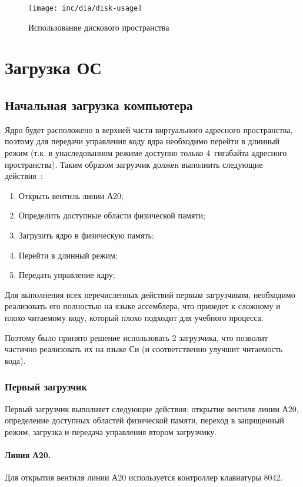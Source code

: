 \begin{figure}[ht!]
  \centering
  \texttt{[image: inc/dia/disk-usage]}
  \caption{Использование дискового пространства}
  \label{fig:disk-usage}
\end{figure}


\section{Загрузка ОС}

\subsection{Начальная загрузка компьютера}
Ядро будет расположено в верхней части
виртуального адресного пространства, поэтому для передачи управления коду
ядра необходимо перейти в длинный режим (т.к. в унаследованном режиме доступно
только 4~гигабайта адресного пространства). Таким образом загрузчик должен
выполнить следующие действия~\cite{mstu_os_dev_method}:
\begin{enumerate}[1.]
\item Открыть вентиль линии А20;
\item Определить доступные области физической памяти;
\item Загрузить ядро в физическую память;
\item Перейти в длинный режим;
\item Передать управление ядру;
\end{enumerate}

Для выполнения всех перечисленных действий первым загрузчиком, необходимо реализовать
его полностью на языке ассемблера, что приведет к сложному и плохо читаемому коду, который
плохо подходит для учебного процесса.

Поэтому было принято решение использовать 2 загрузчика, что позволит частично реализовать
их на языке Си (и соответственно улучшит читаемость кода).

\subsubsection*{Первый загрузчик}
Первый загрузчик выполняет следующие действия: открытие вентиля линии А20, определение доступных
областей физической памяти, переход в защищенный режим, загрузка и передача управления
втором загрузчику.

\paragraph{Линия А20.} Для открытия вентиля линии А20 используется контроллер клавиатуры 8042.

